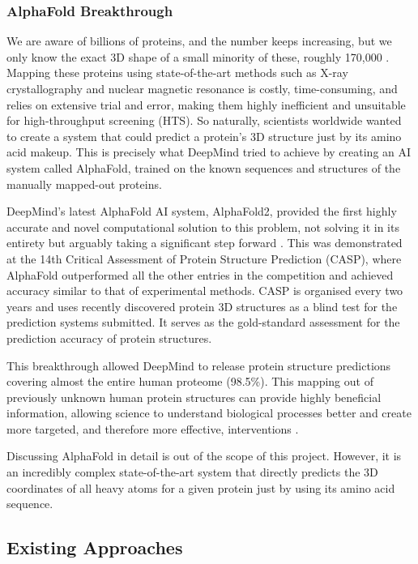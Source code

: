 \subsubsection{AlphaFold Breakthrough}
\label{subsubsec:AlphaFold}

We are aware of billions of proteins, and the number keeps increasing, but we only know the exact 3D shape of a small minority of these, roughly 170,000 \citep{Jumper2021}. Mapping these proteins using state-of-the-art methods such as X-ray crystallography and nuclear magnetic resonance is costly, time-consuming, and relies on extensive trial and error, making them highly inefficient and unsuitable for high-throughput screening (HTS). So naturally, scientists worldwide wanted to create a system that could predict a protein's 3D structure just by its amino acid makeup. This is precisely what DeepMind tried to achieve by creating an AI system called AlphaFold, trained on the known sequences and structures of the manually mapped-out proteins.

DeepMind's latest AlphaFold AI system, AlphaFold2, provided the first highly accurate and novel computational solution to this problem, not solving it in its entirety but arguably taking a significant step forward \citep{Jumper2021}. This was demonstrated at the 14th Critical Assessment of Protein Structure Prediction (CASP), where AlphaFold outperformed all the other entries in the competition and achieved accuracy similar to that of experimental methods. CASP is organised every two years and uses recently discovered protein 3D structures as a blind test for the prediction systems submitted. It serves as the gold-standard assessment for the prediction accuracy of protein structures.

This breakthrough allowed DeepMind to release protein structure predictions covering almost the entire human proteome (98.5\%). This mapping out of previously unknown human protein structures can provide highly beneficial information, allowing science to understand biological processes better and create more targeted, and therefore more effective, interventions \citep{Tunyasuvunakool2021}. 

Discussing AlphaFold in detail is out of the scope of this project. However, it is an incredibly complex state-of-the-art system that directly predicts the 3D coordinates of all heavy atoms for a given protein just by using its amino acid sequence. 

\subsection{Existing Approaches}
\label{subsec:Existing_Approaches}


